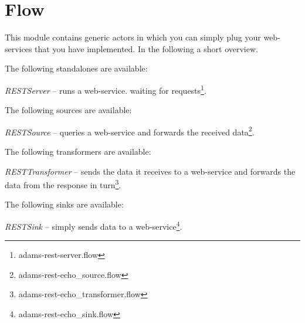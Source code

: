 \documentclass[a4paper]{book}
\begin{document}
\chapter{Flow}
This module contains generic actors in which you can simply plug your 
web-services that you have implemented. In the following a short overview.

The following standalones are available:
\begin{tight_itemize}
	\item \textit{RESTServer} -- runs a web-service. waiting for
	requests\footnote{adams-rest-server.flow}.
\end{tight_itemize}
The following sources are available:
\begin{tight_itemize}
	\item \textit{RESTSource} -- queries a web-service and forwards the received
	data\footnote{adams-rest-echo\_source.flow}.
\end{tight_itemize}
The following transformers are available:
\begin{tight_itemize}
	\item \textit{RESTTransformer} -- sends the data it receives to a web-service
	and forwards the data from the response in
	turn\footnote{adams-rest-echo\_transformer.flow}.
\end{tight_itemize}
The following sinks are available:
\begin{tight_itemize}
	\item \textit{RESTSink} -- simply sends data to a web-service\footnote{adams-rest-echo\_sink.flow}.
\end{tight_itemize}
\end{document}
